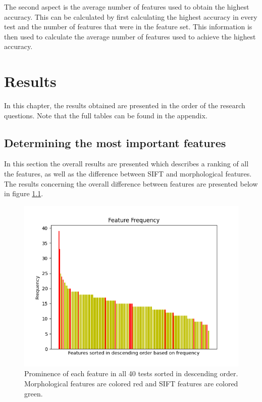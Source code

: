 \documentclass{kththesis}
\begin{document}
The second aspect is the average number of features used to obtain the highest accuracy. This can be calculated by first calculating the highest accuracy in every test and the number of features that were in the feature set. This information is then used to calculate the average number of features used to achieve the highest accuracy. 


\chapter{Results}

In this chapter, the results obtained are presented in the order of the research questions. Note that the full tables can be found in the appendix.


\section{Determining the most important features}

In this section the overall results are presented which describes a ranking of all the features, as well as the difference between SIFT and morphological features. The results concerning the overall difference between features are presented below in figure \ref{fig:all_freq}.




\begin{figure}[h!]
  \centering
  \includegraphics[scale=0.8]{./figures/Figure_all_fres.png}
  \caption{Prominence of each feature in all 40 tests sorted in descending order. Morphological features are colored red and SIFT features are colored green.}
  \label{fig:all_freq}
\end{figure}
\end{document}
